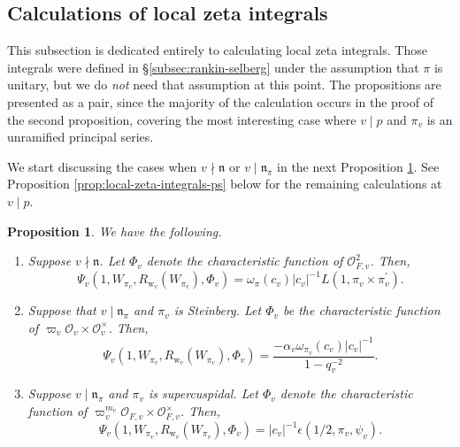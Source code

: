 \documentclass[10pt, twoside]{amsart}
\theoremstyle{plain}
\newtheorem{proposition}[theorem]{Proposition}
\theoremstyle{definition}
\theoremstyle{remark}
\numberwithin{equation}{subsection}
\def\gn{\mathfrak n}
\def\scro{\mathscr O}
\def\scro{\mathscr O}
\begin{document}
\subsection{Calculations of local zeta integrals}\label{subsec:local-zeta-integrals}

This subsection is dedicated entirely to calculating local zeta integrals. Those integrals were defined in \S \ref{subsec:rankin-selberg} under the assumption that $\pi$ is unitary, but we do {\em not} need that assumption at this point. The propositions are presented as a pair, since the majority of the calculation occurs in the proof of the second proposition, covering the most interesting case where $v \mid p$ and $\pi_v$ is an unramified principal series.

{ We start discussing the cases when $v \nmid \gn$ or $v \mid \gn_{\pi}$ in the next Proposition \ref{prop:local-zeta-integrals}. 
See Proposition \ref{prop:local-zeta-integrals-ps} below for the remaining calculations at $v\mid p$.}

\begin{proposition}\label{prop:local-zeta-integrals}
We have the following.
\begin{enumerate}[label=(\roman*)]
\item Suppose $v \nmid \gn$. Let $\Phi_v$ denote the characteristic function of $\scro^2_{F,v}$. Then,\label{prop-part:local-zeta-integrals-unr}
$$
\Psi_v (1, W_{\pi_v}, R_{{ \boldsymbol{\mathrm{w}}}_v} (W_{\pi_v}), \Phi_v) = \omega_\pi (c_v) |c_v|^{-1}  L(1, \pi_v \times \pi^\prime_v).
$$ 
\item Suppose that $v \mid \gn_{\pi}$ and $\pi_v$ is Steinberg. Let $\Phi_v$ be the characteristic function of $\varpi_v\scro_{v} \times \scro_v^{\times}$. Then,\label{prop-part:local-zeta-integrals-st}
\begin{equation*}
\Psi_v(1,W_{\pi_v},R_{{ \boldsymbol{\mathrm{w}}}_v}(W_{\pi_v}),\Phi_v) = \frac{-\alpha_v\omega_{\pi_v}(c_v)|c_v|^{-1}}{1-q_v^{-2}}.
\end{equation*}
\item Suppose $v \mid \gn_\pi$ and $\pi_v$ is supercuspidal. Let $\Phi_v$ denote the characteristic function of $\varpi_v^{m_v} \scro_{F,v} \times \scro^\times_{F,v}$. Then, \label{prop-part:local-zeta-integrals-sc}
$$
\Psi_v (1, W_{\pi_v}, R_{{ \boldsymbol{\mathrm{w}}}_v} (W_{\pi_v}), \Phi_v) = |c_v|^{-1}  \epsilon (1/2, \pi_v, \psi_v).
$$
\end{enumerate}
\end{proposition}
\end{document}
